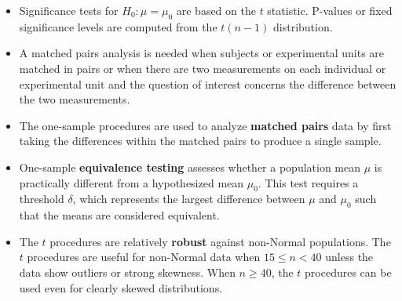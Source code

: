 \begin{itemize}
			\item Significance tests for $H_0: \mu = \mu_0$ are based on the $t$ statistic. P-values or fixed significance levels are computed from the $t(n - 1)$ distribution.
			
			\item A matched pairs analysis is needed when subjects or experimental units are matched in pairs or when there are two measurements on each individual or experimental unit and the question of interest concerns the difference between the two measurements.
			
			\item The one-sample procedures are used to analyze \textbf{matched pairs} data by first taking the differences within the matched pairs to produce a single sample.
			
			\item One-sample \textbf{equivalence testing} assesses whether a population mean $\mu$ is practically different from a hypothesized mean $\mu_0$. This test requires a threshold $\delta$, which represents the largest difference between $\mu$ and $\mu_0$ such that the means are considered equivalent.
			
			\item The $t$ procedures are relatively \textbf{robust} against non-Normal populations. The $t$ procedures are useful for non-Normal data when $15\leq n<40$ unless the data show outliers or strong skewness. When $n\geq 40$, the $t$ procedures can be used even for clearly skewed distributions.
		\end{itemize}
